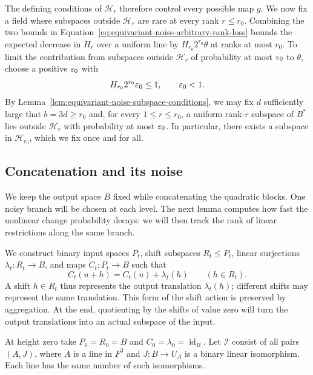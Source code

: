 The defining conditions of $\mathcal H_r$ therefore control every possible map $g$.  We now fix a
field where subspaces outside $\mathcal H_r$ are rare at every rank $r\le r_0$.  Combining the two bounds in
Equation~\eqref{eq:equivariant-noise-arbitrary-rank-loss} bounds the expected decrease in $H_r$
over a uniform line by $H_{r_0}2^{r_0}\theta$ at ranks at most $r_0$.
To limit the contribution from subspaces outside $\mathcal H_r$ of probability at most
$\varepsilon_0$ to $\theta$, choose a positive $\varepsilon_0$ with
\begin{equation}\label{eq:equivariant-noise-subspace-conditions-error}
 H_{r_0}2^{r_0}\varepsilon_0\le1,
 \qquad \varepsilon_0<1.
\end{equation}
By Lemma~\ref{lem:equivariant-noise-subspace-conditions}, we may fix $d$ sufficiently large that
$b=3d\ge r_0$ and, for every $1\le r\le r_0$, a uniform rank-$r$
subspace of $B^*$ lies outside $\mathcal H_r$ with probability at most $\varepsilon_0$.
In particular, there exists a subspace in $\mathcal H_{r_0}$, which we fix
once and for all.

\subsection{Concatenation and its noise}

We keep the output space $B$ fixed while concatenating the quadratic blocks.
One noisy branch will be chosen at each level.  The next lemma computes how
fast the nonlinear change probability decays; we will then track the rank
of linear restrictions along the same branch.

We construct binary input spaces $P_t$, shift subspaces $R_t\le P_t$,
linear surjections $\lambda_t:R_t\to B$, and maps $C_t:P_t\to B$ such that
\begin{equation}\label{eq:equivariant-noise-recursive-equivariance}
 C_t(u+h)=C_t(u)+\lambda_t(h)
 \qquad(h\in R_t).
\end{equation}
A shift $h\in R_t$ thus represents the output translation $\lambda_t(h)$;
different shifts may represent the same translation.  This form of the
shift action is preserved by aggregation.  At the end, quotienting by the
shifts of value zero will turn the output translations into an actual
subspace of the input.

At height zero take $P_0=R_0=B$ and $C_0=\lambda_0=\operatorname{id}_B$.
Let $\mathcal I$ consist of all pairs $(A,J)$, where $A$ is a line in
$F^3$ and $J:B\to U_A$ is a binary linear isomorphism.  Each line has
the same number of such isomorphisms.


